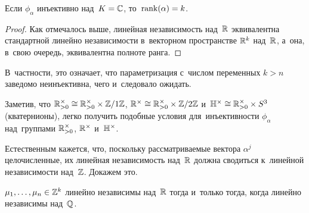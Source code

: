 \documentclass[a4paper,oneside]{article}
\begin{document}
\begin{consequence*}
  Если $\phi_\alpha$ инъективно над~$K = \mathbb{C}$, то~$\mathrm{rank}(\alpha) = k$.
\end{consequence*}

\begin{proof}
  Как отмечалось выше, линейная независимость над~$\mathbb{R}$ эквивалентна стандартной линейно независимости
  в~векторном пространстве $\mathbb{R}^k$ над~$\mathbb{R}$, а~она, в~свою очередь, эквивалентна полноте ранга.
\end{proof}

В~частности, это означает, что параметризация с~числом переменных $k > n$ заведомо неинъективна, чего и~следовало ожидать.

Заметив, что $\mathbb{R}_{>0}^\times \cong \mathbb{R}_{>0}^\times \times \mathbb{Z} / 1\mathbb{Z}$, $\mathbb{R}^\times \cong \mathbb{R}_{>0}^\times \times \mathbb{Z} / 2 \mathbb{Z}$
и~$\mathbb{H}^\times \cong \mathbb{R}_{>0}^\times \times S^3$ (кватернионы), легко получить подобные условия для~инъективности
$\phi_\alpha$ над~группами $\mathbb{R}_{>0}^\times$, $\mathbb{R}^\times$ и~$\mathbb{H}^\times$.

Естественным кажется, что, поскольку рассматриваемые вектора $\alpha^j$ целочисленные, их линейная независимость
над~$\mathbb{R}$ должна сводиться к~линейной независимости над~$\mathbb{Z}$. Докажем это.

\begin{lemma*}
  $\mu_1, \ldots, \mu_n \in \mathbb{Z}^k$ линейно независимы над~$\mathbb{R}$ тогда и~только тогда, когда линейно независимы над~$\mathbb{Q}$.
\end{lemma*}
\end{document}
